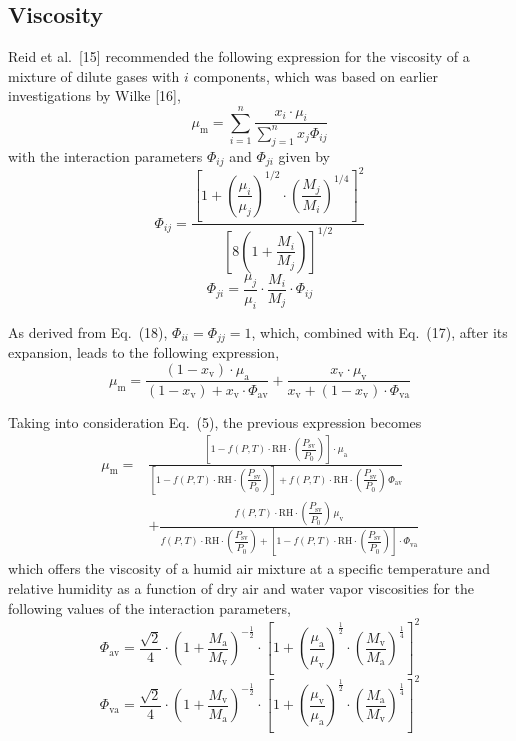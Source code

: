 \documentclass[11pt]{article}
\newcommand{\Psv}{P_\mathrm{sv}}
\newcommand{\RH}{\mathrm{RH}}
\newcommand{\fPT}{f(P,T)}
\newcommand{\grp}{\fPT\cdot\RH\cdot\left(\dfrac{\Psv}{P_0}\right)}
\begin{document}
\subsection{Viscosity}

Reid et al.\ [15] recommended the following expression for the
viscosity of a mixture of dilute gases with $i$ components, which was
based on earlier investigations by Wilke [16],
\begin{equation}
\mu_\mathrm{m} = \sum_{i=1}^{n}
  \frac{x_i\cdot\mu_i}{\sum_{j=1}^{n} x_j \Phi_{ij}}
\end{equation}
with the interaction parameters $\Phi_{ij}$ and $\Phi_{ji}$ given by
\begin{equation}
\Phi_{ij} = \frac{\left[1
  + \left(\dfrac{\mu_i}{\mu_j}\right)^{1/2}
  \cdot\left(\dfrac{M_j}{M_i}\right)^{1/4}\right]^{2}}
  {\left[8\left(1+\dfrac{M_i}{M_j}\right)\right]^{1/2}}
\end{equation}
\begin{equation}
\Phi_{ji} = \frac{\mu_j}{\mu_i}\cdot\frac{M_i}{M_j}\cdot\Phi_{ij}
\end{equation}

\noindent As derived from Eq.~(18), $\Phi_{ii} = \Phi_{jj} = 1$, which,
combined with Eq.~(17), after its expansion, leads to the following
expression,
\begin{equation}
\mu_\mathrm{m} = \frac{(1-x_\mathrm{v})\cdot\mu_\mathrm{a}}
  {(1-x_\mathrm{v}) + x_\mathrm{v}\cdot\Phi_\mathrm{av}}
  + \frac{x_\mathrm{v}\cdot\mu_\mathrm{v}}
  {x_\mathrm{v} + (1-x_\mathrm{v})\cdot\Phi_\mathrm{va}}
\end{equation}

\noindent Taking into consideration Eq.~(5), the previous expression
becomes
\begin{equation}
\begin{split}
\mu_\mathrm{m} = {} &
 \frac{\left[1-\grp\right]\cdot\mu_\mathrm{a}}
      {\left[1-\grp\right] + \grp\,\Phi_\mathrm{av}} \\[6pt]
 & + \frac{\grp\,\mu_\mathrm{v}}
        {\grp + \left[1-\grp\right]\cdot\Phi_\mathrm{va}}
\end{split}
\end{equation}
which offers the viscosity of a humid air mixture at a specific
temperature and relative humidity as a function of dry air and water
vapor viscosities for the following values of the interaction
parameters,
\begin{equation}
\Phi_\mathrm{av} = \frac{\sqrt{2}}{4}
  \cdot\left(1+\frac{M_\mathrm{a}}{M_\mathrm{v}}\right)^{-\frac{1}{2}}
  \cdot\left[1
  + \left(\frac{\mu_\mathrm{a}}{\mu_\mathrm{v}}\right)^{\frac{1}{2}}
  \cdot\left(\frac{M_\mathrm{v}}{M_\mathrm{a}}\right)^{\frac{1}{4}}
  \right]^{2}
\end{equation}
\begin{equation}
\Phi_\mathrm{va} = \frac{\sqrt{2}}{4}
  \cdot\left(1+\frac{M_\mathrm{v}}{M_\mathrm{a}}\right)^{-\frac{1}{2}}
  \cdot\left[1
  + \left(\frac{\mu_\mathrm{v}}{\mu_\mathrm{a}}\right)^{\frac{1}{2}}
  \cdot\left(\frac{M_\mathrm{a}}{M_\mathrm{v}}\right)^{\frac{1}{4}}
  \right]^{2}
\end{equation}
\end{document}
